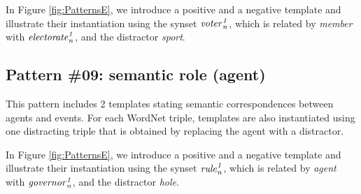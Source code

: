 \documentclass[11pt]{article}
\newcommand{\WORDNET}{WordNet}
\newcommand{\synset}[3]{{\it{#1}_{#3}^{#2}}}
\begin{document}
In Figure \ref{fig:PatternsE}, we introduce a positive and a negative template and illustrate their instantiation using the synset $\synset{voter}{1}{n}$, which is related by {\it member} with $\synset{electorate}{1}{n}$, and the distractor {\it sport}.

\subsection{Pattern \#09: semantic role (agent)}

This pattern includes 2 templates stating semantic correspondences between agents and events. For each \WORDNET{} triple, templates are also instantiated using one distracting triple that is obtained by replacing the agent with a distractor.

In Figure \ref{fig:PatternsE}, we introduce a positive and a negative template and illustrate their instantiation using the synset $\synset{rule}{1}{n}$, which is related by {\it agent} with $\synset{governor}{1}{n}$, and the distractor {\it hole}.
\end{document}
